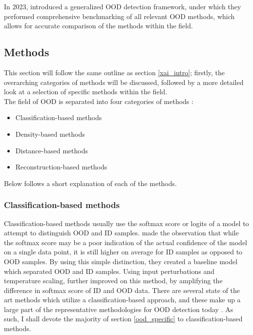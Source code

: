 \documentclass[UKenglish]{uiomasterthesis} %
\theoremstyle{definition}
\begin{document}
In 2023, \cite{openood} introduced a generalized OOD detection framework, under which they performed comprehensive benchmarking of all relevant OOD methods, which allows for accurate comparison of the methods within the field.

\subsection{Methods}

This section will follow the same outline as section \ref{xai_intro}; firstly, the overarching categories of methods will be discussed, followed by a more detailed look at a selection of specific methods within the field.
\\

The field of OOD is separated into four categories of methods \cite{oodoverview}:

\begin{itemize}
  \item Classification-based methods
  \item Density-based methods
  \item Distance-based methods
  \item Reconstruction-based methods
\end{itemize}



Below follows a short explanation of each of the methods.
\\

\subsubsection{Classification-based methods}

Classification-based methods usually use the softmax score or logits of a model to attempt to distinguish OOD and ID samples. \cite{oodbaseline} made the observation that while the softmax score may be a poor indication of the actual confidence of the model on a single data point, it is still higher on average for ID samples as opposed to OOD samples. By using this simple distinction, they created a baseline model which separated OOD and ID samples. Using input perturbations and temperature scaling, \cite{odin} further improved on this method, by amplifying the difference in softmax score of ID and OOD data. There are several state of the art methods which utilize a classification-based approach, and these make up a large part of the representative methodologies for OOD detection today \cite[8]{oodoverview}. As such, I shall devote the majority of section \ref{ood_specific} to classification-based methods.
\\
\end{document}
